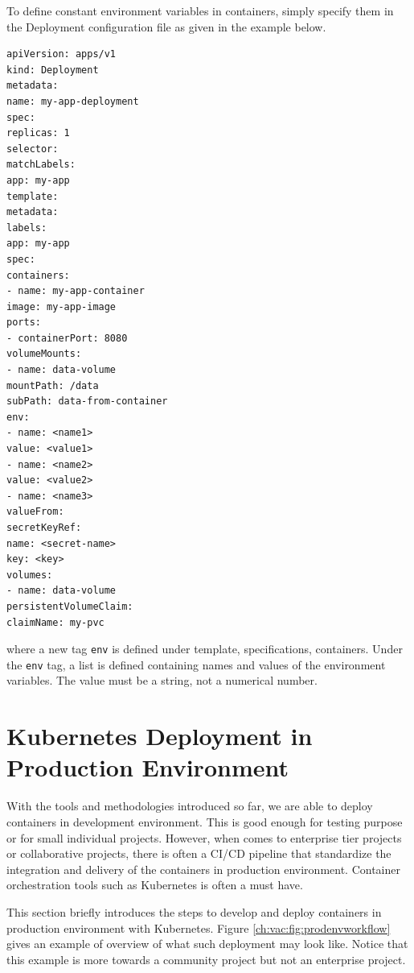 To define constant environment variables in containers, simply specify them in the Deployment configuration file as given in the example below.

\begin{lstlisting}
apiVersion: apps/v1
kind: Deployment
metadata:
name: my-app-deployment
spec:
replicas: 1
selector:
matchLabels:
app: my-app
template:
metadata:
labels:
app: my-app
spec:
containers:
- name: my-app-container
image: my-app-image
ports:
- containerPort: 8080
volumeMounts:
- name: data-volume
mountPath: /data
subPath: data-from-container
env:
- name: <name1>
value: <value1>
- name: <name2>
value: <value2>
- name: <name3>
valueFrom:
secretKeyRef:
name: <secret-name>
key: <key>
volumes:
- name: data-volume
persistentVolumeClaim:
claimName: my-pvc
\end{lstlisting}
where a new tag \verb|env| is defined under template, specifications, containers. Under the \verb|env| tag, a list is defined containing names and values of the environment variables. The value must be a string, not a numerical number.

\section{Kubernetes Deployment in Production Environment}

With the tools and methodologies introduced so far, we are able to deploy containers in development environment. This is good enough for testing purpose or for small individual projects. However, when comes to enterprise tier projects or collaborative projects, there is often a CI/CD pipeline that standardize the integration and delivery of the containers in production environment. Container orchestration tools such as Kubernetes is often a must have.

This section briefly introduces the steps to develop and deploy containers in production environment with Kubernetes. Figure \ref{ch:vac:fig:prodenvworkflow} gives an example of overview of what such deployment may look like. Notice that this example is more towards a community project but not an enterprise project.

